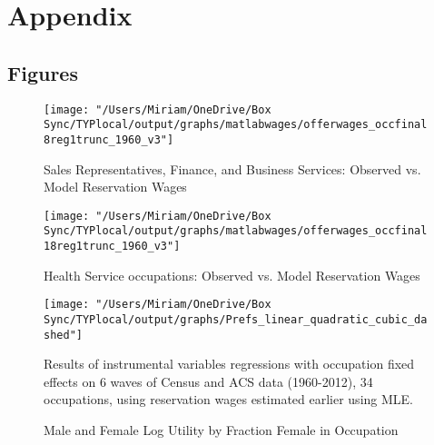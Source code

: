 \documentclass[11pt]{article}
\begin{document}
\newpage

\clearpage

\section{Appendix}


\subsection{Figures}



\begin{figure}[H]
\centering
\caption{Sales Representatives, Finance, and Business Services: Observed vs. Model Reservation Wages}
\label{sales}
\texttt{[image: "/Users/Miriam/OneDrive/Box Sync/TYPlocal/output/graphs/matlabwages/offerwages\_occfinal8reg1trunc\_1960\_v3"]}
\end{figure}

\begin{figure}[H]
\centering
\caption{Health Service occupations: Observed vs. Model Reservation Wages}
\label{health}
\texttt{[image: "/Users/Miriam/OneDrive/Box Sync/TYPlocal/output/graphs/matlabwages/offerwages\_occfinal18reg1trunc\_1960\_v3"]}
\end{figure}

\begin{figure}[H]
\caption{Male and Female Log Utility by Fraction Female in Occupation}
\label{prefs}
\begin{center}
\texttt{[image: "/Users/Miriam/OneDrive/Box Sync/TYPlocal/output/graphs/Prefs\_linear\_quadratic\_cubic\_dashed"]}
\begin{minipage}{.8\textwidth}
\begin{tablenotes}
\footnotesize
\item Results of instrumental variables regressions with occupation fixed effects on 6 waves of Census and ACS data (1960-2012), 34 occupations, using reservation wages estimated earlier using MLE.
\end{tablenotes}
\end{minipage}
\end{center}
\end{figure}
\end{document}
